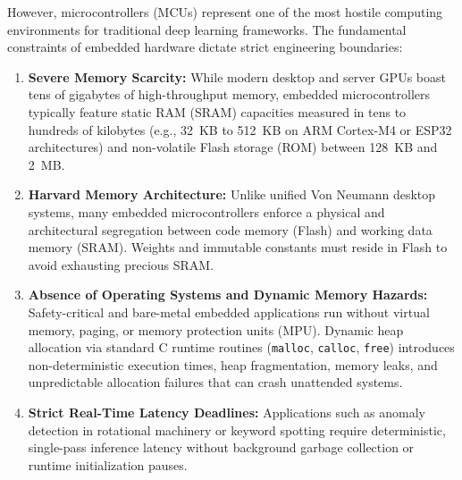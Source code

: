 \documentclass[11pt,a4paper]{article}
\begin{document}
However, microcontrollers (MCUs) represent one of the most hostile computing environments for traditional deep learning frameworks. The fundamental constraints of embedded hardware dictate strict engineering boundaries:
\begin{enumerate}[leftmargin=*]
    \item \textbf{Severe Memory Scarcity:} While modern desktop and server GPUs boast tens of gigabytes of high-throughput memory, embedded microcontrollers typically feature static RAM (SRAM) capacities measured in tens to hundreds of kilobytes (e.g., 32~KB to 512~KB on ARM Cortex-M4 or ESP32 architectures) and non-volatile Flash storage (ROM) between 128~KB and 2~MB.
    \item \textbf{Harvard Memory Architecture:} Unlike unified Von Neumann desktop systems, many embedded microcontrollers enforce a physical and architectural segregation between code memory (Flash) and working data memory (SRAM). Weights and immutable constants must reside in Flash to avoid exhausting precious SRAM.
    \item \textbf{Absence of Operating Systems and Dynamic Memory Hazards:} Safety-critical and bare-metal embedded applications run without virtual memory, paging, or memory protection units (MPU). Dynamic heap allocation via standard C runtime routines (\texttt{malloc}, \texttt{calloc}, \texttt{free}) introduces non-deterministic execution times, heap fragmentation, memory leaks, and unpredictable allocation failures that can crash unattended systems.
    \item \textbf{Strict Real-Time Latency Deadlines:} Applications such as anomaly detection in rotational machinery or keyword spotting require deterministic, single-pass inference latency without background garbage collection or runtime initialization pauses.
\end{enumerate}
\end{document}
